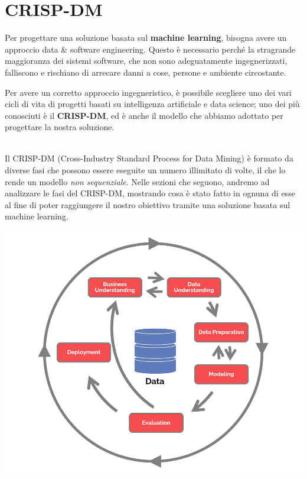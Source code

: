 \documentclass[a4paper, 11pt, oneside]{report}
\begin{document}
            \section{CRISP-DM}
            Per progettare una soluzione basata sul \textbf{machine learning}, bisogna avere un approccio data \& software
            engineering.
            Questo è necessario perché la stragrande maggioranza dei sistemi software, che non sono adeguatamente ingegnerizzati,
            falliscono e rischiano di arrecare danni a cose, persone e ambiente circostante.
            \par \noindent Per avere un corretto approccio ingegneristico, è possibile scegliere uno dei vari cicli di vita
            di progetti basati su intelligenza artificiale e data science; uno dei più conosciuti è il \textbf{CRISP-DM}, ed è anche
            il modello che abbiamo adottato per progettare la nostra soluzione.
            \par \noindent
            \\ \noindent Il CRISP-DM (Cross-Industry Standard Process for Data Mining) è formato da diverse fasi che possono
            essere eseguite un numero illimitato di volte, il che lo rende un modello \textit{non sequenziale}.
            Nelle sezioni che seguono, andremo ad analizzare le fasi del CRISP-DM, mostrando cosa è stato fatto in ognuna di esse
            al fine di poter raggiungere il nostro obiettivo tramite una soluzione basata sul machine learning.
            \par \noindent
            \begin{center}
                \includegraphics[scale=0.3]{CRISP-DM}
            \end{center}
\end{document}
